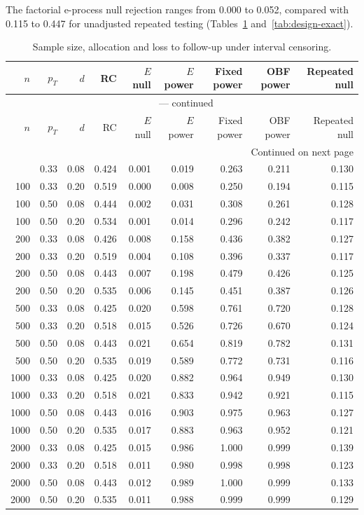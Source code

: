 \documentclass[12pt]{article}
\theoremstyle{definition}
\theoremstyle{remark}
\begin{document}
The factorial e-process null rejection ranges from 0.000 to 0.052, compared with 0.115 to 0.447 for unadjusted repeated testing (Tables~\ref{tab:design-interval} and~\ref{tab:design-exact}).
\par
\begingroup
\scriptsize
\setlength{\tabcolsep}{3pt}
\renewcommand{\arraystretch}{1.10}
\setlength{\LTcapwidth}{\textwidth}
\begin{longtable}{rrrrrrrrr}
\caption{Sample size, allocation and loss to follow-up under interval censoring.}\label{tab:design-interval}\\
\toprule
$n$ & $p_T$ & $d$ & RC & $E$ null & $E$ power & Fixed power & OBF power & Repeated null \\
\midrule
\endfirsthead
\multicolumn{9}{c}{\tablename\ \thetable{} --- continued}\\
\toprule
$n$ & $p_T$ & $d$ & RC & $E$ null & $E$ power & Fixed power & OBF power & Repeated null \\
\midrule
\endhead
\midrule
\multicolumn{9}{r}{Continued on next page}\\
\endfoot
\bottomrule
\endlastfoot
100 & 0.33 & 0.08 & 0.424 & 0.001 & 0.019 & 0.263 & 0.211 & 0.130 \\
100 & 0.33 & 0.20 & 0.519 & 0.000 & 0.008 & 0.250 & 0.194 & 0.115 \\
100 & 0.50 & 0.08 & 0.444 & 0.002 & 0.031 & 0.308 & 0.261 & 0.128 \\
100 & 0.50 & 0.20 & 0.534 & 0.001 & 0.014 & 0.296 & 0.242 & 0.117 \\
200 & 0.33 & 0.08 & 0.426 & 0.008 & 0.158 & 0.436 & 0.382 & 0.127 \\
200 & 0.33 & 0.20 & 0.519 & 0.004 & 0.108 & 0.396 & 0.337 & 0.117 \\
200 & 0.50 & 0.08 & 0.443 & 0.007 & 0.198 & 0.479 & 0.426 & 0.125 \\
200 & 0.50 & 0.20 & 0.535 & 0.006 & 0.145 & 0.451 & 0.387 & 0.126 \\
500 & 0.33 & 0.08 & 0.425 & 0.020 & 0.598 & 0.761 & 0.720 & 0.128 \\
500 & 0.33 & 0.20 & 0.518 & 0.015 & 0.526 & 0.726 & 0.670 & 0.124 \\
500 & 0.50 & 0.08 & 0.443 & 0.021 & 0.654 & 0.819 & 0.782 & 0.131 \\
500 & 0.50 & 0.20 & 0.535 & 0.019 & 0.589 & 0.772 & 0.731 & 0.116 \\
1000 & 0.33 & 0.08 & 0.425 & 0.020 & 0.882 & 0.964 & 0.949 & 0.130 \\
1000 & 0.33 & 0.20 & 0.518 & 0.021 & 0.833 & 0.942 & 0.921 & 0.115 \\
1000 & 0.50 & 0.08 & 0.443 & 0.016 & 0.903 & 0.975 & 0.963 & 0.127 \\
1000 & 0.50 & 0.20 & 0.535 & 0.017 & 0.883 & 0.963 & 0.952 & 0.121 \\
2000 & 0.33 & 0.08 & 0.425 & 0.015 & 0.986 & 1.000 & 0.999 & 0.139 \\
2000 & 0.33 & 0.20 & 0.518 & 0.011 & 0.980 & 0.998 & 0.998 & 0.123 \\
2000 & 0.50 & 0.08 & 0.443 & 0.012 & 0.989 & 1.000 & 0.999 & 0.133 \\
2000 & 0.50 & 0.20 & 0.535 & 0.011 & 0.988 & 0.999 & 0.999 & 0.129 \\
\end{longtable}
\end{document}

